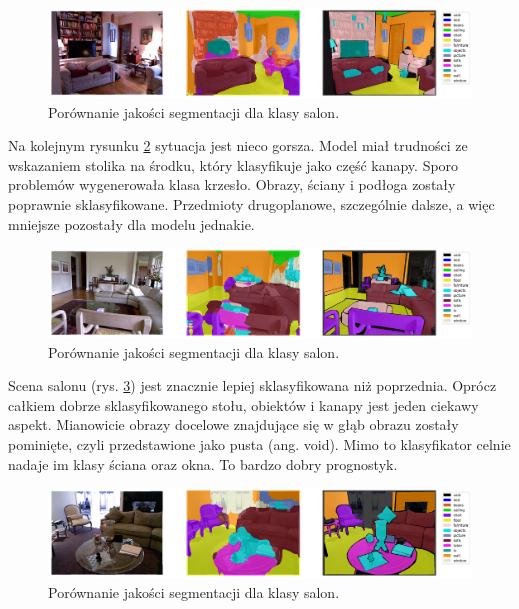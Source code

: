 \begin{figure}[ht!]
    \centering
    \includegraphics[width=\textwidth]{img/preds_analysis/gt_vs_pred/living_room-1.png}
    \caption{Porównanie jakości segmentacji dla klasy salon.}
    \label{fig:living_room-pred-1}
\end{figure}

Na kolejnym rysunku \ref{fig:living_room-pred-2} sytuacja jest nieco gorsza. Model miał trudności ze wskazaniem stolika na środku, który klasyfikuje jako część kanapy. Sporo problemów wygenerowała klasa krzesło. Obrazy, ściany i podłoga zostały poprawnie sklasyfikowane. Przedmioty drugoplanowe, szczególnie dalsze, a więc mniejsze pozostały dla modelu jednakie.
\begin{figure}[ht!]
    \centering
    \includegraphics[width=\textwidth]{img/preds_analysis/gt_vs_pred/living_room-2.png}
    \caption{Porównanie jakości segmentacji dla klasy salon.}
    \label{fig:living_room-pred-2}
\end{figure}

Scena salonu (rys. \ref{fig:living_room-pred-3}) jest znacznie lepiej sklasyfikowana niż poprzednia. Oprócz całkiem dobrze sklasyfikowanego stołu, obiektów i kanapy jest jeden ciekawy aspekt. Mianowicie obrazy docelowe znajdujące się w głąb obrazu zostały pominięte, czyli przedstawione jako pusta (ang. void). Mimo to klasyfikator celnie nadaje im klasy ściana oraz okna. To bardzo dobry prognostyk.

\begin{figure}[ht!]
    \centering
    \includegraphics[width=\textwidth]{img/preds_analysis/gt_vs_pred/living_room-3.png}
    \caption{Porównanie jakości segmentacji dla klasy salon.}
    \label{fig:living_room-pred-3}
\end{figure}

